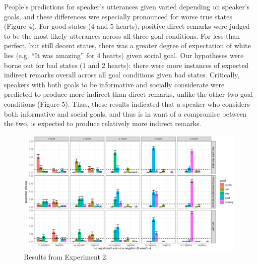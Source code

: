 \documentclass[10pt, letterpaper]{article}
\newenvironment{CodeChunk}{}{}
\begin{document}
People's predictions for speaker's utterances given varied depending on
speaker's goals, and these differences wre especially pronounced for
worse true states (Figure 4). For good states (4 and 5 hearts), positive
direct remarks were judged to be the most likely utterances across all
three goal conditions. For less-than-perfect, but still decent states,
there was a greater degree of expectation of white lies (e.g. ``It was
amazing'' for 4 hearts) given social goal. Our hypotheses were borne out
for bad states (1 and 2 hearts): there were more instances of expected
indirect remarks overall across all goal conditions given bad states.
Critically, speakers with both goals to be informative and socially
considerate were predicted to produce more indirect than direct remarks,
unlike the other two goal conditions (Figure 5). Thus, these results
indicated that a speaker who considers both informative and social
goals, and thus is in want of a compromise between the two, is expected
to produce relatively more indirect remarks.

\begin{CodeChunk}
\captionsetup{width=0.8\textwidth}\begin{figure}[b]

{\centering \includegraphics{figs/expt2_results-1} 

}

\caption[Results from Experiment 2]{Results from Experiment 2.}\label{fig:expt2_results}
\end{figure}
\end{CodeChunk}
\end{document}
